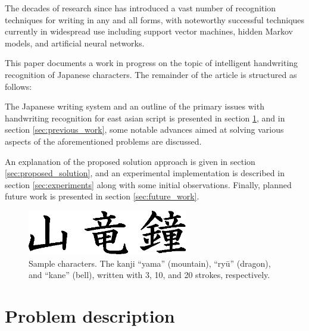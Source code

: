 \documentclass[10pt,conference,a4paper]{IEEEtran}
\begin{document}
	The decades of research since has introduced a vast number of recognition techniques for writing in any and all forms, with noteworthy successful techniques
	currently in widespread use including support vector machines, hidden Markov models, and artificial neural networks. \cite{fujisawa2008forty, tappert1990state}

	This paper documents a work in progress on the topic of intelligent handwriting recognition of Japanese characters.
	The remainder of the article is structured as follows:

	The Japanese writing system and an outline of the primary issues with handwriting recognition for east asian script is presented in section \ref{sec:problem_description}, and
	in section \ref{sec:previous_work}, some notable advances aimed at solving various aspects of the aforementioned problems are discussed.

	An explanation of the proposed solution approach is given in section \ref{sec:proposed_solution}, and an experimental implementation is described in section \ref{sec:experiments}
	along with some initial observations. Finally, planned future work is presented in section \ref{sec:future_work}.

	
	\begin{figure}
		\centering
		\includegraphics[width=2.75in]{./fig/yama-ryuu-kane.eps}
		\caption{Sample characters. The kanji ``yama'' (mountain), ``ry\=u'' (dragon), and ``kane'' (bell), written with 3, 10, and 20 strokes, respectively.}
		\label{fig_kanji_sample}
	\end{figure}



	\section{Problem description}
	\label{sec:problem_description}
\end{document}

